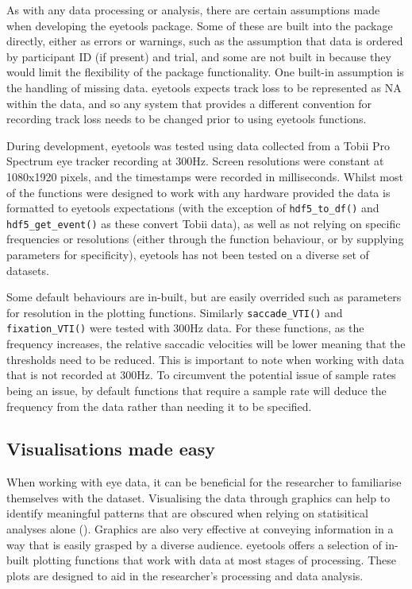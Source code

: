 \documentclass[
  man,
  floatsintext,
  longtable,
  nolmodern,
  notxfonts,
  notimes,
  colorlinks=true,linkcolor=blue,citecolor=blue,urlcolor=blue]{apa7}
\begin{document}
As with any data processing or analysis, there are certain assumptions
made when developing the eyetools package. Some of these are built into
the package directly, either as errors or warnings, such as the
assumption that data is ordered by participant ID (if present) and
trial, and some are not built in because they would limit the
flexibility of the package functionality. One built-in assumption is the
handling of missing data. eyetools expects track loss to be represented
as NA within the data, and so any system that provides a different
convention for recording track loss needs to be changed prior to using
eyetools functions.

During development, eyetools was tested using data collected from a
Tobii Pro Spectrum eye tracker recording at 300Hz. Screen resolutions
were constant at 1080x1920 pixels, and the timestamps were recorded in
milliseconds. Whilst most of the functions were designed to work with
any hardware provided the data is formatted to eyetools expectations
(with the exception of \texttt{hdf5\_to\_df()} and
\texttt{hdf5\_get\_event()} as these convert Tobii data), as well as not
relying on specific frequencies or resolutions (either through the
function behaviour, or by supplying parameters for specificity),
eyetools has not been tested on a diverse set of datasets.

Some default behaviours are in-built, but are easily overrided such as
parameters for resolution in the plotting functions. Similarly
\texttt{saccade\_VTI()} and \texttt{fixation\_VTI()} were tested with
300Hz data. For these functions, as the frequency increases, the
relative saccadic velocities will be lower meaning that the thresholds
need to be reduced. This is important to note when working with data
that is not recorded at 300Hz. To circumvent the potential issue of
sample rates being an issue, by default functions that require a sample
rate will deduce the frequency from the data rather than needing it to
be specified.

\subsection{Visualisations made easy}\label{visualisations-made-easy}

When working with eye data, it can be beneficial for the researcher to
familiarise themselves with the dataset. Visualising the data through
graphics can help to identify meaningful patterns that are obscured when
relying on statisitical analyses alone
().
Graphics are also very effective at conveying information in a way that
is easily grasped by a diverse audience. eyetools offers a selection of
in-built plotting functions that work with data at most stages of
processing. These plots are designed to aid in the researcher's
processing and data analysis.
\end{document}
